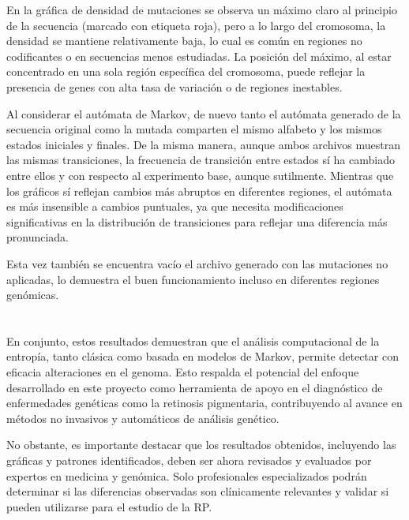 \documentclass[11pt,spanish,listoffigures,listoftables]{tfgetsinf}
\begin{document}
En la gráfica de densidad de mutaciones se observa un máximo claro al principio de la secuencia (marcado con etiqueta roja), pero a lo largo del cromosoma, la densidad se mantiene relativamente baja, lo cual es común en regiones no codificantes o en secuencias menos estudiadas. La posición del máximo, al estar concentrado en una sola región específica del cromosoma, puede reflejar la presencia de genes con alta tasa de variación o de regiones inestables.

Al considerar el autómata de Markov, de nuevo tanto el autómata generado de la secuencia original como la mutada comparten el mismo alfabeto y los mismos estados iniciales y finales. De la misma manera, aunque ambos archivos muestran las mismas transiciones, la frecuencia de transición entre estados sí ha cambiado entre ellos y con respecto al experimento base, aunque sutilmente. Mientras que los gráficos sí reflejan cambios más abruptos en diferentes regiones, el autómata es más insensible a cambios puntuales, ya que necesita modificaciones significativas en la distribución de transiciones para reflejar una diferencia más pronunciada.

Esta vez también se encuentra vacío el archivo generado con las mutaciones no aplicadas, lo demuestra el buen funcionamiento incluso en diferentes regiones genómicas.\\\\\\

En conjunto, estos resultados demuestran que el análisis computacional de la entropía, tanto clásica como basada en modelos de Markov, permite detectar con eficacia alteraciones en el genoma. Esto respalda el potencial del enfoque desarrollado en este proyecto como herramienta de apoyo en el diagnóstico de enfermedades genéticas como la retinosis pigmentaria, contribuyendo al avance en métodos no invasivos y automáticos de análisis genético.

No obstante, es importante destacar que los resultados obtenidos, incluyendo las gráficas y patrones identificados, deben ser ahora revisados y evaluados por expertos en medicina y genómica. Solo profesionales especializados podrán determinar si las diferencias observadas son clínicamente relevantes y validar si pueden utilizarse para el estudio de la \ac{RP}.


\end{document}
